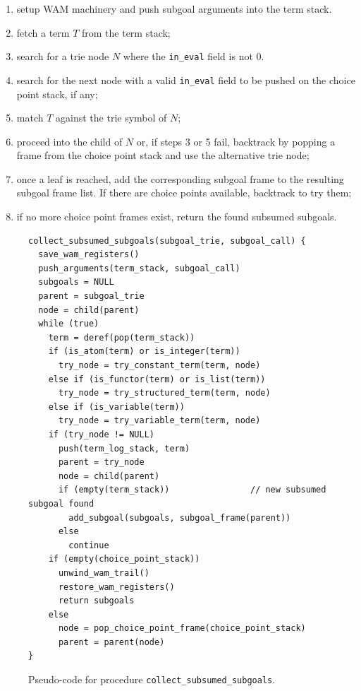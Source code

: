 \begin{enumerate}
\item setup WAM machinery and push subgoal arguments into the term
  stack.
\item fetch a term $T$ from the term stack;
\item search for a trie node $N$ where the \texttt{in\_eval} field is not 0.
\item search for the next node with a valid \texttt{in\_eval} field to be
  pushed on the choice point stack, if any;
\item match $T$ against the trie symbol of $N$;
\item proceed into the child of $N$ or, if steps 3 or 5 fail,
  backtrack by popping a frame from the choice point stack and use the
  alternative trie node;
\item once a leaf is reached, add the corresponding subgoal frame to
  the resulting subgoal frame list. If there are choice points
  available, backtrack to try them;
\item if no more choice point frames exist, return the found subsumed
  subgoals.
\end{enumerate}

\begin{figure}[ht]
\begin{Verbatim}
collect_subsumed_subgoals(subgoal_trie, subgoal_call) {
  save_wam_registers()
  push_arguments(term_stack, subgoal_call)
  subgoals = NULL
  parent = subgoal_trie
  node = child(parent)
  while (true)
    term = deref(pop(term_stack))    
    if (is_atom(term) or is_integer(term))
      try_node = try_constant_term(term, node)
    else if (is_functor(term) or is_list(term))
      try_node = try_structured_term(term, node)
    else if (is_variable(term))
      try_node = try_variable_term(term, node)
    if (try_node != NULL)
      push(term_log_stack, term)
      parent = try_node
      node = child(parent)
      if (empty(term_stack))                // new subsumed subgoal found
        add_subgoal(subgoals, subgoal_frame(parent))
      else
        continue
    if (empty(choice_point_stack))
      unwind_wam_trail()
      restore_wam_registers()
      return subgoals
    else
      node = pop_choice_point_frame(choice_point_stack)
      parent = parent(node)
}
\end{Verbatim}
\caption{Pseudo-code for procedure \texttt{collect\_subsumed\_subgoals}.}
\label{fig:collect_subsumed_subgoals}
\end{figure}


